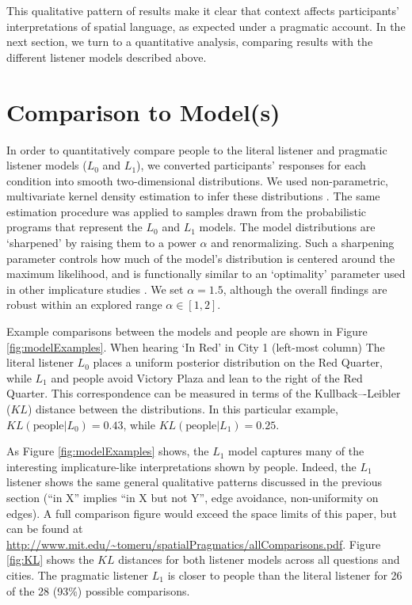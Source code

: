 \documentclass[10pt,letterpaper]{article}
\begin{document}
This qualitative pattern of results make it clear that context affects participants' interpretations of spatial language, as expected under a pragmatic account.
In the next section, we turn to a quantitative analysis, comparing results with the different listener models described above. 

\section{Comparison to Model(s)}

In order to quantitatively compare people to the literal listener and pragmatic listener models ($L_0$ and $L_1$), we converted participants' responses for each condition into smooth two-dimensional distributions. We used non-parametric, multivariate kernel density estimation to infer these distributions \cite{epanechnikov1969non}. The same estimation procedure was applied to samples drawn from the probabilistic programs that represent the $L_0$ and $L_1$ models. The model distributions are `sharpened' by raising them to a power $\alpha$ and renormalizing. Such a sharpening parameter controls how much of the model's distribution is centered around the maximum likelihood, and is functionally similar to an `optimality' parameter used in other implicature studies \cite{ndg+ast:topics2013,kao2014}. We set $\alpha=1.5$, although the overall findings are robust within an explored range $\alpha \in [1,2]$. 



Example comparisons between the models and people are shown in Figure \ref{fig:modelExamples}. When hearing `In Red' in City 1 (left-most column) The literal listener $L_0$ places a uniform posterior distribution on the Red Quarter, while $L_1$ and people avoid Victory Plaza and lean to the right of the Red Quarter. This correspondence can be measured in terms of the Kullback–-Leibler ($KL$) distance between the distributions. In this particular example, $KL(\text{people} | L_0) = 0.43$, while $KL(\text{people} | L_1) = 0.25$. 



As Figure \ref{fig:modelExamples} shows, the $L_1$ model captures many of the interesting implicature-like interpretations shown by people.
Indeed, the $L_1$ listener shows the same general qualitative patterns discussed in the previous section (``in X'' implies ``in X but not Y'', edge avoidance, non-uniformity on edges). A full comparison figure would exceed the space limits of this paper, but can be found at \url{http://www.mit.edu/~tomeru/spatialPragmatics/allComparisons.pdf}. Figure \ref{fig:KL} shows the $KL$ distances for both listener models across all questions and cities. The pragmatic listener $L_1$ is closer to people than the literal listener for 26 of the 28 (93\%) possible comparisons. 
\end{document}
